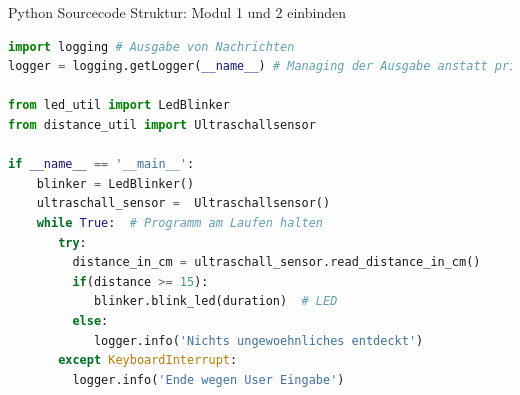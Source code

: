 \begin{frame}[fragile]{Python Sourcecode Struktur: Modul 1  und 2 einbinden}
\begin{lstlisting}[language=Python]
import logging # Ausgabe von Nachrichten
logger = logging.getLogger(__name__) # Managing der Ausgabe anstatt print() Funktion

from led_util import LedBlinker
from distance_util import Ultraschallsensor

if __name__ == '__main__':
    blinker = LedBlinker()
    ultraschall_sensor =  Ultraschallsensor()
    while True:  # Programm am Laufen halten
       try:
         distance_in_cm = ultraschall_sensor.read_distance_in_cm()
         if(distance >= 15):
            blinker.blink_led(duration)  # LED
         else:
            logger.info('Nichts ungewoehnliches entdeckt')
       except KeyboardInterrupt:
         logger.info('Ende wegen User Eingabe')

\end{lstlisting}
\end{frame}





